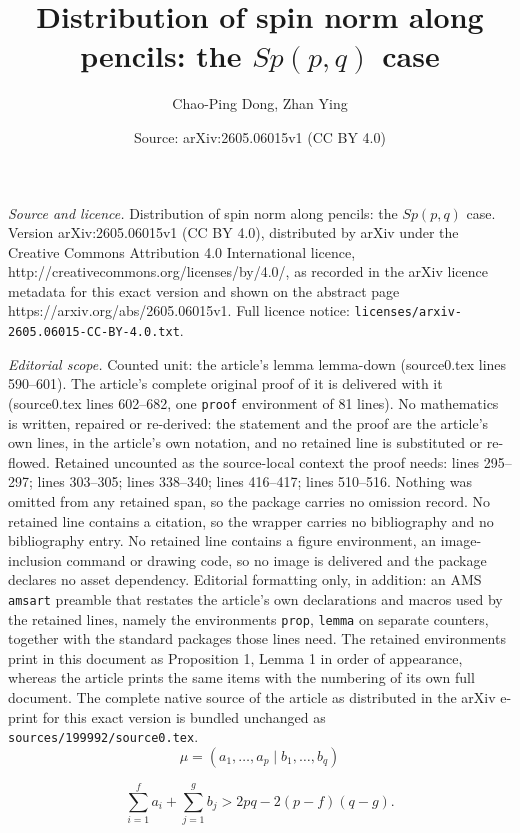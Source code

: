 \documentclass[10pt,a4paper]{amsart}
\title{Distribution of spin norm along pencils: the $Sp(p, q)$ case}
\author{Chao-Ping Dong, Zhan Ying}
\date{Source: arXiv:2605.06015v1 (CC BY 4.0)}
\begin{document}
\maketitle

\noindent\emph{Source and licence.} Distribution of spin norm along pencils: the $Sp(p, q)$ case. Version arXiv:2605.06015v1 (CC BY 4.0), distributed by arXiv under the Creative Commons Attribution 4.0 International licence, http://creativecommons.org/licenses/by/4.0/, as recorded in the arXiv licence metadata for this exact version and shown on the abstract page https://arxiv.org/abs/2605.06015v1. Full licence notice: \texttt{licenses/arxiv-2605.06015-CC-BY-4.0.txt}.\par\smallskip

\noindent\textit{Editorial scope.} Counted unit: the article's lemma lemma-down (source0.tex lines 590--601). The article's complete original proof of it is delivered with it (source0.tex lines 602--682, one \texttt{proof} environment of 81 lines). No mathematics is written, repaired or re-derived: the statement and the proof are the article's own lines, in the article's own notation, and no retained line is substituted or re-flowed.  Retained uncounted as the source-local context the proof needs: lines 295--297; lines 303--305; lines 338--340; lines 416--417; lines 510--516.  Nothing was omitted from any retained span, so the package carries no omission record.  No retained line contains a citation, so the wrapper carries no bibliography and no bibliography entry.  No retained line contains a figure environment, an image-inclusion command or drawing code, so no image is delivered and the package declares no asset dependency.  Editorial formatting only, in addition: an AMS \texttt{amsart} preamble that restates the article's own declarations and macros used by the retained lines, namely the environments \texttt{prop}, \texttt{lemma} on separate counters, together with the standard packages those lines need.  The retained environments print in this document as Proposition 1, Lemma 1 in order of appearance, whereas the article prints the same items with the numbering of its own full document.  The complete native source of the article as distributed in the arXiv e-print for this exact version is bundled unchanged as \texttt{sources/199992/source0.tex}.
\begin{equation}\label{mu}
\mu=(a_1,\dots,a_p\mid b_1,\dots,b_q)
 \end{equation}

\begin{equation}\label{eq4}
\sum_{i=1}^f a_i+\sum_{j=1}^g b_j>2pq-2(p-f)(q-g).
\end{equation}
\end{document}
